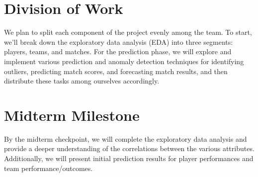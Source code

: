 \documentclass{article}
\begin{document}
\section{Division of Work}
\label{others}
We plan to split each component of the project evenly among the team. To start, we'll break down the exploratory data analysis (EDA) into three segments: players, teams, and matches. For the prediction phase, we will explore and implement various prediction and anomaly detection techniques for identifying outliers, predicting match scores, and forecasting match results, and then distribute these tasks among ourselves accordingly.

\section{Midterm Milestone}
By the midterm checkpoint, we will complete the exploratory data analysis and provide a deeper understanding of the correlations between the various attributes. Additionally, we will present initial prediction results for player performances and team performance/outcomes.
\end{document}
